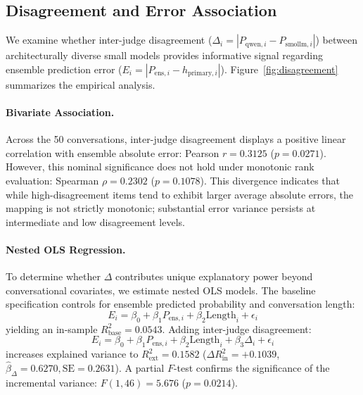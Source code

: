 \subsection{Disagreement and Error Association}
\label{subsec:disagreement_analysis}

We examine whether inter-judge disagreement ($\Delta_i = |P_{\text{qwen}, i} - P_{\text{smollm}, i}|$) between architecturally diverse small models provides informative signal regarding ensemble prediction error ($E_i = |P_{\text{ens}, i} - h_{\text{primary}, i}|$). Figure~\ref{fig:disagreement} summarizes the empirical analysis.

\paragraph{Bivariate Association.}
Across the 50 conversations, inter-judge disagreement displays a positive linear correlation with ensemble absolute error: Pearson $r=0.3125$ ($p=0.0271$). However, this nominal significance does not hold under monotonic rank evaluation: Spearman $\rho=0.2302$ ($p=0.1078$). This divergence indicates that while high-disagreement items tend to exhibit larger average absolute errors, the mapping is not strictly monotonic; substantial error variance persists at intermediate and low disagreement levels.

\paragraph{Nested OLS Regression.}
To determine whether $\Delta$ contributes unique explanatory power beyond conversational covariates, we estimate nested OLS models. The baseline specification controls for ensemble predicted probability and conversation length:
\begin{equation}
    E_i = \beta_0 + \beta_1 P_{\text{ens}, i} + \beta_2 \text{Length}_i + \epsilon_i
\end{equation}
yielding an in-sample $R^2_{\text{base}} = 0.0543$. Adding inter-judge disagreement:
\begin{equation}
    E_i = \beta_0 + \beta_1 P_{\text{ens}, i} + \beta_2 \text{Length}_i + \beta_3 \Delta_i + \epsilon_i
\end{equation}
increases explained variance to $R^2_{\text{ext}} = 0.1582$ ($\Delta R^2_{\text{in}} = +0.1039$, $\hat{\beta}_{\Delta} = 0.6270, \text{SE} = 0.2631$). A partial $F$-test confirms the significance of the incremental variance: $F(1, 46) = 5.676$ ($p = 0.0214$).

